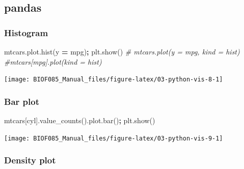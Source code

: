 \documentclass[
  letterpaper,
]{scrbook}
\newenvironment{Shaded}{\begin{snugshade}}{\end{snugshade}}
\newcommand{\CommentTok}[1]{\textcolor[rgb]{0.56,0.35,0.01}{\textit{#1}}}
\newcommand{\NormalTok}[1]{#1}
\newcommand{\OperatorTok}[1]{\textcolor[rgb]{0.81,0.36,0.00}{\textbf{#1}}}
\newcommand{\StringTok}[1]{\textcolor[rgb]{0.31,0.60,0.02}{#1}}
\begin{document}
\hypertarget{pandas-1}{%
\subsection{pandas}\label{pandas-1}}

\hypertarget{histogram}{%
\subsubsection{Histogram}\label{histogram}}

\begin{Shaded}
\begin{Highlighting}[]
\NormalTok{mtcars.plot.hist(y }\OperatorTok{=} \StringTok{\textquotesingle{}mpg\textquotesingle{}}\NormalTok{)}\OperatorTok{;}
\NormalTok{plt.show()}
\CommentTok{\# mtcars.plot(y = \textquotesingle{}mpg\textquotesingle{}, kind = \textquotesingle{}hist\textquotesingle{})}
\CommentTok{\#mtcars[\textquotesingle{}mpg\textquotesingle{}].plot(kind = \textquotesingle{}hist\textquotesingle{})}
\end{Highlighting}
\end{Shaded}

\begin{center}\texttt{[image: BIOF085\_Manual\_files/figure-latex/03-python-vis-8-1]} \end{center}

\hypertarget{bar-plot}{%
\subsubsection{Bar plot}\label{bar-plot}}

\begin{Shaded}
\begin{Highlighting}[]
\NormalTok{mtcars[}\StringTok{\textquotesingle{}cyl\textquotesingle{}}\NormalTok{].value\_counts().plot.bar()}\OperatorTok{;}
\NormalTok{plt.show()}
\end{Highlighting}
\end{Shaded}

\begin{center}\texttt{[image: BIOF085\_Manual\_files/figure-latex/03-python-vis-9-1]} \end{center}

\hypertarget{density-plot}{%
\subsubsection{Density plot}\label{density-plot}}
\end{document}
